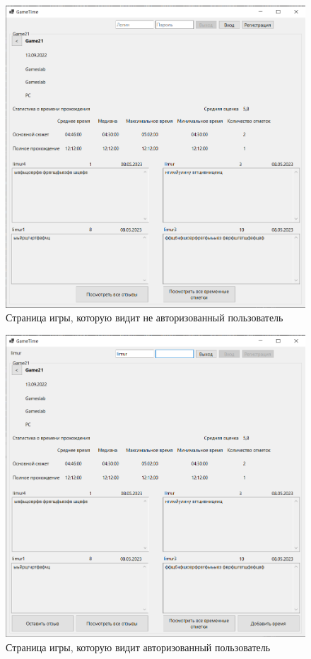 \begin{figure}[H]
	\begin{center}
		\includegraphics[scale=0.7]{../imgs/interface/gamePageGuest.png}
	\end{center}
	\captionsetup{justification=centering}
	\caption{Страница игры, которую видит не авторизованный пользователь}
	\label{img:gamePageGuest}
\end{figure}

\begin{figure}[H]
	\begin{center}
		\includegraphics[scale=0.7]{../imgs/interface/gamePageUser.png}
	\end{center}
	\captionsetup{justification=centering}
	\caption{Страница игры, которую видит авторизованный пользователь}
	\label{img:gamePageUser}
\end{figure}

